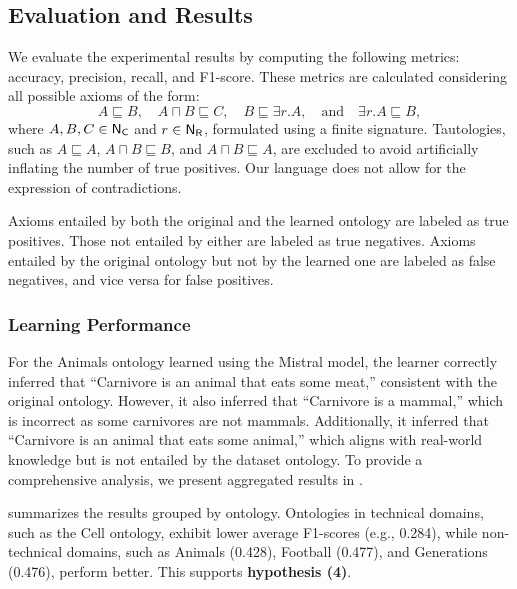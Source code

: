 \subsection{Evaluation and Results}
\label{subsec:evaluation-and-results}
%
We evaluate the experimental results by computing the following metrics: accuracy, precision, recall, and F1-score.
%
These metrics are calculated considering all possible axioms of the form:
%
\[
A \sqsubseteq B, \quad A \sqcap B \sqsubseteq C, \quad B \sqsubseteq \exists r.A, \quad \text{and} \quad \exists r.A \sqsubseteq B,
\]
%
where \(A, B, C \in {\sf N_C}\) and \(r \in {\sf N_R}\), formulated using a finite signature.
%
Tautologies, such as \(A \sqsubseteq A\), \(A \sqcap B \sqsubseteq B\), and \(A \sqcap B \sqsubseteq A\), are excluded to avoid artificially inflating the number of true positives.
%
Our language does not allow for the expression of contradictions.

%
Axioms entailed by both the original and the learned ontology are labeled as true positives.
%
Those not entailed by either are labeled as true negatives.
%
Axioms entailed by the original ontology but not by the learned one are labeled as false negatives, and vice versa for false positives.

%
\subsubsection{Learning Performance}
\label{subsubsec:learning-performance}
%

%

%

%

%
For the Animals ontology learned using the Mistral model, the learner correctly inferred that ``Carnivore is an animal that eats some meat,'' consistent with the original ontology.
%
However, it also inferred that ``Carnivore is a mammal,'' which is incorrect as some carnivores are not mammals.
%
Additionally, it inferred that ``Carnivore is an animal that eats some animal,'' which aligns with real-world knowledge but is not entailed by the dataset ontology.
%
To provide a comprehensive analysis, we present aggregated results in .

%
 summarizes the results grouped by ontology.
%
Ontologies in technical domains, such as the Cell ontology, exhibit lower average F1-scores (e.g., 0.284), while non-technical domains, such as Animals (0.428), Football (0.477), and Generations (0.476), perform better.
%
This supports \textbf{hypothesis (4)}.

